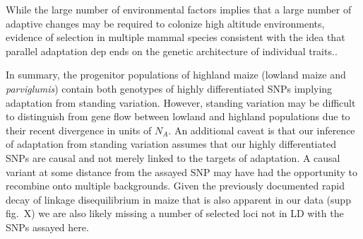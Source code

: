 





While the large number of environmental factors implies that a large number of adaptive changes may be required to colonize     high altitude environments, evidence of selection in multiple mammal species consistent with the idea that parallel adaptation dep    ends on the genetic architecture of individual traits.\cite[]{Yi_2010_20595611,Simonson_2010_20466884,Storz_2007_17397259,Qiu_2012_    22751099}.

In summary, the progenitor populations of highland maize (lowland maize and \emph{parviglumis}) contain both genotypes of highly differentiated SNPs implying adaptation from standing variation.
However, standing variation may be difficult to distinguish from gene flow between lowland and highland populations due to their recent divergence in units of $N_A$.
An additional caveat is that our inference of adaptation from standing variation assumes that our highly differentiated SNPs are causal and not merely linked to the targets of adaptation.  A causal variant at some distance from the assayed SNP may have had the opportunity to recombine onto multiple backgrounds. 
Given the previously documented rapid decay of linkage disequilibrium in maize \cite[]{Tenaillon_2001_11470895,Remington_2001_11562485} that is also apparent in our data (supp fig.~X) we are also likely missing a number of selected loci not in LD with the SNPs assayed here.

